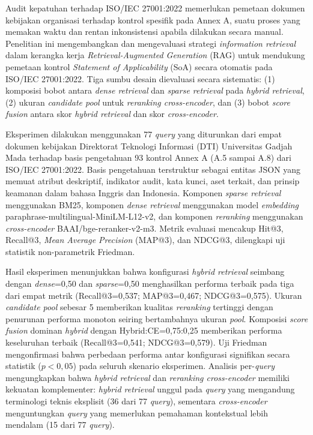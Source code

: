 Audit kepatuhan terhadap ISO/IEC 27001:2022 memerlukan pemetaan dokumen kebijakan organisasi terhadap kontrol spesifik pada Annex A, suatu proses yang memakan waktu dan rentan inkonsistensi apabila dilakukan secara manual. Penelitian ini mengembangkan dan mengevaluasi strategi \textit{information retrieval} dalam kerangka kerja \textit{Retrieval-Augmented Generation} (RAG) untuk mendukung pemetaan kontrol \textit{Statement of Applicability} (SoA) secara otomatis pada ISO/IEC 27001:2022. Tiga sumbu desain dievaluasi secara sistematis: (1) komposisi bobot antara \textit{dense retrieval} dan \textit{sparse retrieval} pada \textit{hybrid retrieval}, (2) ukuran \textit{candidate pool} untuk \textit{reranking cross-encoder}, dan (3) bobot \textit{score fusion} antara skor \textit{hybrid retrieval} dan skor \textit{cross-encoder}.

Eksperimen dilakukan menggunakan 77 \textit{query} yang diturunkan dari empat dokumen kebijakan Direktorat Teknologi Informasi (DTI) Universitas Gadjah Mada terhadap basis pengetahuan 93 kontrol Annex A (A.5 sampai A.8) dari ISO/IEC 27001:2022. Basis pengetahuan terstruktur sebagai entitas JSON yang memuat atribut deskriptif, indikator audit, kata kunci, aset terkait, dan prinsip keamanan dalam bahasa Inggris dan Indonesia. Komponen \textit{sparse retrieval} menggunakan BM25, komponen \textit{dense retrieval} menggunakan model \textit{embedding} paraphrase-multilingual-MiniLM-L12-v2, dan komponen \textit{reranking} menggunakan \textit{cross-encoder} BAAI/bge-reranker-v2-m3. Metrik evaluasi mencakup Hit@3, Recall@3, \textit{Mean Average Precision} (MAP@3), dan NDCG@3, dilengkapi uji statistik non-parametrik Friedman.

Hasil eksperimen menunjukkan bahwa konfigurasi \textit{hybrid retrieval} seimbang dengan \textit{dense}=0{,}50 dan \textit{sparse}=0{,}50 menghasilkan performa terbaik pada tiga dari empat metrik (Recall@3=0{,}537; MAP@3=0{,}467; NDCG@3=0{,}575). Ukuran \textit{candidate pool} sebesar 5 memberikan kualitas \textit{reranking} tertinggi dengan penurunan performa monoton seiring bertambahnya ukuran \textit{pool}. Komposisi \textit{score fusion} dominan \textit{hybrid} dengan Hybrid:CE=0{,}75:0{,}25 memberikan performa keseluruhan terbaik (Recall@3=0{,}541; NDCG@3=0{,}579). Uji Friedman mengonfirmasi bahwa perbedaan performa antar konfigurasi signifikan secara statistik ($p < 0{,}05$) pada seluruh skenario eksperimen. Analisis per-\textit{query} mengungkapkan bahwa \textit{hybrid retrieval} dan \textit{reranking cross-encoder} memiliki kekuatan komplementer: \textit{hybrid retrieval} unggul pada \textit{query} yang mengandung terminologi teknis eksplisit (36 dari 77 \textit{query}), sementara \textit{cross-encoder} menguntungkan \textit{query} yang memerlukan pemahaman kontekstual lebih mendalam (15 dari 77 \textit{query}).

